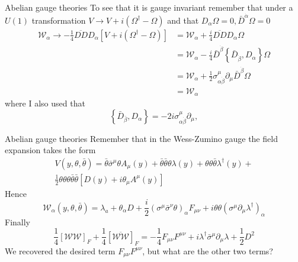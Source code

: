 \documentclass[10pt]{beamer}
\begin{document}
\begin{frame}{Abelian gauge theories}
To see that it is gauge invariant remember that under a $U(1)$ transformation $V \to V + i\left(\Omega^{\dagger} - \Omega\right)$ and that 
$D_\alpha \Omega = 0, \bar D^{\dot \alpha} \Omega = 0$
\begin{equation*}
\begin{aligned}
    \mathcal{W}_{\alpha} \rightarrow-\frac{1}{4} \overline{D D} D_{\alpha}\left[V+i\left(\Omega^{\dagger}-\Omega\right)\right] &=\mathcal{W}_{\alpha}+\frac{i}{4} \overline{D D} D_{\alpha} \Omega \\
    &=\mathcal{W}_{\alpha}-\frac{i}{4} \bar{D}^{\dot{\beta}}\left\{\bar{D}_{\dot{\beta}}, D_{\alpha}\right\} \Omega \\
    &=\mathcal{W}_{\alpha}+\frac{1}{2} \sigma_{\alpha \dot{\beta}}^{\mu} \partial_{\mu} \bar{D}^{\dot{\beta}} \Omega \\
    &=\mathcal{W}_{\alpha}
\end{aligned}
\end{equation*}
where I also used that 
\begin{equation*}
    \left\{\bar{D}_{\bar\beta}, D_{\alpha}\right\}= - 2 i \sigma_{\alpha \dot{\beta}}^{\mu} \partial_{\mu},
\end{equation*}
\end{frame}

\begin{frame}{Abelian gauge theories}
Remember that in the Wess-Zumino gauge the field expansion takes the form 
\begin{gather*}
    V(y, \theta, \bar \theta) = \bar\theta \bar{\sigma}^{\mu} \theta A_{\mu}(y)+\bar\theta \bar\theta \theta \lambda(y)+\theta \theta \bar\theta \lambda^{\dagger}(y) + \\ 
    \frac{1}{2} \theta \theta \theta \bar\theta \bar\theta\left[D(y)+i \theta_{\mu} A^{\mu}(y)\right]
\end{gather*}
Hence 
\begin{equation*}
    \mathcal{W}_{\alpha}\left(y, \theta, \bar\theta\right)=\lambda_{a}+\theta_{\alpha} D+\frac{i}{2}\left(\sigma^{\mu} \bar{\sigma}^{\nu} \theta\right)_{\alpha} F_{\mu \nu}+i \theta \theta\left(\sigma^{\mu} \partial_{\mu} \lambda^{\dagger}\right)_{\alpha}
\end{equation*}
Finally 
\begin{equation*}
    \frac{1}{4}\left[\mathcal{WW}\right]_F + \frac{1}{4} \left[\overline{\mathcal{WW}}\right]_F = -\frac{1}{4} F_{\mu\nu} F^{\mu\nu} + i \lambda^{\dagger} \bar\sigma^{\mu} \partial_{\mu} \lambda + \frac{1}{2} D^2
\end{equation*}
We recovered the desired term $F_{\mu\nu}F^{\mu\nu}$, but what are the other two terms?
\end{frame}
\end{document}

